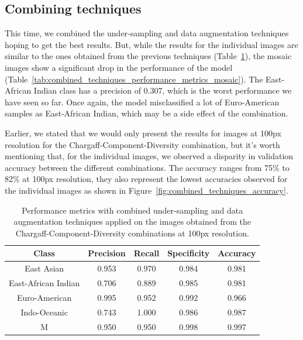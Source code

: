 \subsection{Combining techniques}
\label{subsec:combining_techniques}

\label{subsubsec:results_combining_techniques}

This time, we combined the under-sampling and data augmentation techniques hoping to get the best results. But, while the results for the individual images
are similar to the ones obtained from the previous techniques (Table~\ref{tab:combined_techniques_performance_metrics}), the mosaic images show a significant
drop in the performance of the model (Table~\ref{tab:combined_techniques_performance_metrics_mosaic}). The East-African Indian class has a precision of 0.307,
which is the worst performance we have seen so far. Once again, the model misclassified a lot of Euro-American samples as East-African Indian, which may be a
side effect of the combination.

Earlier, we stated that we would only present the results for images at 100px resolution for the Chargaff-Component-Diversity combination, but it's worth
mentioning that, for the individual images, we observed a disparity in validation accuracy between the different combinations. The accuracy ranges from 75\%
to 82\% at 100px resolution, they also represent the lowest accuracies observed for the individual images as shown in Figure~\ref{fig:combined_techniques_accuracy}.

\begin{table}[H]
	\centering
	\begin{tabular}{|c|c|c|c|c|}
		\hline
		\textbf{Class}      & \textbf{Precision} & \textbf{Recall} & \textbf{Specificity} & \textbf{Accuracy} \\
		\hline
		East Asian          & 0.953              & 0.970           & 0.984                & 0.981             \\
		East-African Indian & 0.706              & 0.889           & 0.985                & 0.981             \\
		Euro-American       & 0.995              & 0.952           & 0.992                & 0.966             \\
		Indo-Oceanic        & 0.743              & 1.000           & 0.986                & 0.987             \\
		M                   & 0.950              & 0.950           & 0.998                & 0.997             \\
		\hline
	\end{tabular}
	\caption{Performance metrics with combined under-sampling and data augmentation techniques applied on the images obtained from the
		Chargaff-Component-Diversity combinations at 100px resolution.}
	\label{tab:combined_techniques_performance_metrics}
\end{table}

